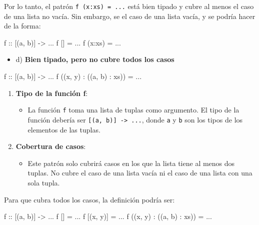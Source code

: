 \documentclass{article}
\begin{document}
    Por lo tanto, el patrón \verb|f (x:xs) = ...| está bien tipado y cubre al menos el caso de una lista no vacía. Sin embargo, se el caso de una lista vacía, y se podría hacer de la forma:
\begin{haskell}
f :: [(a, b)] -> ...
f [] = ...     
f (x:xs) = ... 
\end{haskell}

\begin{itemize}
    \item 
    d) \textbf{Bien tipado, pero no cubre todos los casos}
    \end{itemize}
    \begin{haskell}
    f :: [(a, b)] -> ...
    f ((x, y) : ((a, b) : xs)) = ...
    \end{haskell}
    \begin{enumerate}
    \item 
    \textbf{Tipo de la función f}:
    \begin{itemize}
    \item 
    La función \verb|f| toma una lista de tuplas como argumento. El tipo de la función debería ser \verb|[(a, b)] -> ...|, donde \verb|a| y \verb|b| son los tipos de los elementos de las tuplas.
    \end{itemize}
    \item 
    \textbf{Cobertura de casos}:
    \begin{itemize}
    \item 
    Este patrón solo cubrirá casos en los que la lista tiene al menos dos tuplas. No cubre el caso de una lista vacía ni el caso de una lista con una sola tupla.
    \end{itemize}
    \end{enumerate}
    
    Para que cubra todos los casos, la definición podría ser:
    \begin{haskell}
    f :: [(a, b)] -> ...
    f [] = ...                   
    f [(x, y)] = ...             
    f ((x, y) : ((a, b) : xs)) = ... 
    \end{haskell}
    
\end{document}
